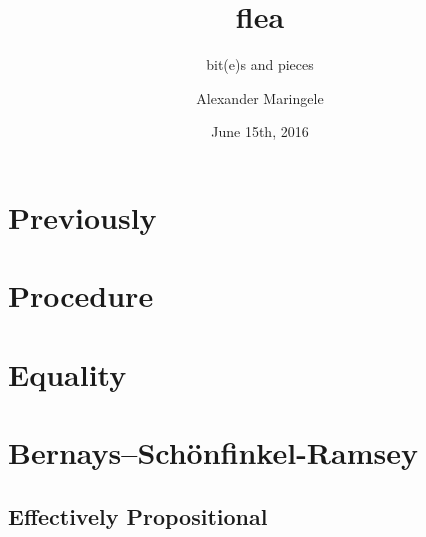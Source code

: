 



\author{Alexander Maringele}
\title{flea\\
}
\subtitle{bit(e)s and pieces}
\date{June 15th, 2016}

%



 

%

\frame{
	\setcounter{tocdepth}{1}
	\tableofcontents}

%

%


\section{Previously}



\section{Procedure}



\section{Equality}



\section{Bernays–Schönfinkel-Ramsey}

\subsection{Effectively Propositional}

